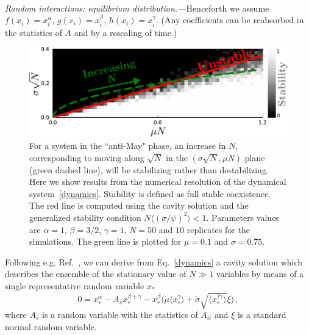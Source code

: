 \documentclass[
 prl,
 twocolumn,
 amsmath,
 amssymb,
 aps,
]{revtex4-2}
\begin{document}
\paragraph*{}
\emph{Random interactions: equilibrium distribution.---}Henceforth we assume $f(x_i)=x_i^{\alpha}$, $g(x_i)=x_i^{\beta}$, $h(x_i)=x_i^{\gamma}$. 
(Any coefficients can be reabsorbed in the statistics of $A$ and by a rescaling of time.)
\begin{figure}[t!]
    \includegraphics[width=.45\textwidth]{beta1_5-S50-N10-diversity-increase.pdf}
    \caption{For a system in the ``anti-May" phase, an increase in $N$,
    corresponding to moving along $\sqrt{N}$ in the $(\sigma \sqrt{N},\mu N)$ plane (green dashed line), will be stabilizing rather than destabilizing.
    Here we show results from the numerical resolution of the dynamical system~\eqref{dynamics}. Stability is defined as full stable coexistence. The red line is computed using the cavity solution and the generalized stability condition $N\langle (\sigma/\psi)^2\rangle < 1$.
    Parameters values are $\alpha=1$, $\beta=3/2$,
    $\gamma=1$, $N=50$ and $10$ replicates for the simulations. The green line is plotted for $\mu=0.1$ and $\sigma=0.75$.}
    \label{fig: stability line + sims}
\end{figure}
Following e.g. Ref.~\cite{Roy2019}, we can derive from Eq.~\eqref{dynamics} a cavity solution which describes the ensemble of the stationary value of $N\gg 1$ variables by means of a single representative random variable $x_*$
\begin{equation}
    0 = x_*^{\alpha}-A_sx_*^{\beta+\gamma}-x_*^{\beta}\big( \tilde{\mu} \langle x_*^{\gamma}\rangle + \tilde{\sigma} \sqrt{\langle x_*^{2\gamma}\rangle}\xi\big) \, ,
\label{eq: dmft}
\end{equation}
where $A_s$ is a random variable with the statistics of $A_{ii}$ and $\xi$ is a standard normal random variable. 
\end{document}

